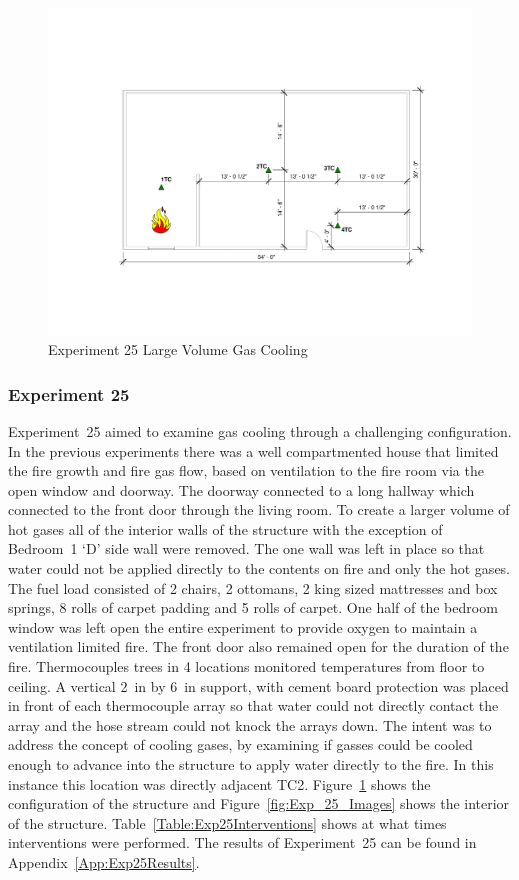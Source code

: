 \documentclass[12pt,oneside]{book}
\begin{document}
\begin{figure}[H]
\centering
\includegraphics[width=5in]{../0_Images/Ventilation_Configurations/Gas_Cooling}
\caption{Experiment 25 Large Volume Gas Cooling}
\label{fig:Gas_Cooling}
\end{figure}

\subsubsection{Experiment 25}
Experiment~25 aimed to examine gas cooling through a challenging configuration. In the previous experiments there was a well compartmented house that limited the fire growth and fire gas flow, based on ventilation to the fire room via the open window and doorway.  The doorway connected to a long hallway which connected to the front door through the living room.  To create a larger volume of hot gases all of the interior walls of the structure with the exception of Bedroom~1 `D' side wall were removed.  The one wall was left in place so that water could not be applied directly to the contents on fire and only the hot gases.  The fuel load consisted of 2 chairs, 2 ottomans, 2 king sized mattresses and box springs, 8 rolls of carpet padding and 5 rolls of carpet.  One half of the bedroom window was left open the entire experiment to provide oxygen to maintain a ventilation limited fire.  The front door also remained open for the duration of the fire.  Thermocouples trees in 4 locations monitored temperatures from floor to ceiling.  A vertical 2~in by 6~in support, with cement board protection was placed in front of each thermocouple array so that water could not directly contact the array and the hose stream could not knock the arrays down.  The intent was to address the concept of cooling gases, by examining if gasses could be cooled enough to advance into the structure to apply water directly to the fire. In this instance this location was directly adjacent TC2. Figure~\ref{fig:Gas_Cooling} shows the configuration of the structure and Figure~\ref{fig:Exp_25_Images} shows the interior of the structure. Table~\ref{Table:Exp25Interventions} shows at what times interventions were performed. The results of Experiment~25 can be found in Appendix~\ref{App:Exp25Results}. 
\end{document}
